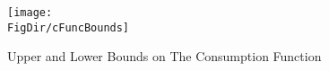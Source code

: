 \begin{figure}
\centering
\texttt{[image: \\FigDir/cFuncBounds]}
\caption{Upper and Lower Bounds on The Consumption Function}
\label{fig:cFuncBounds}
\end{figure}
